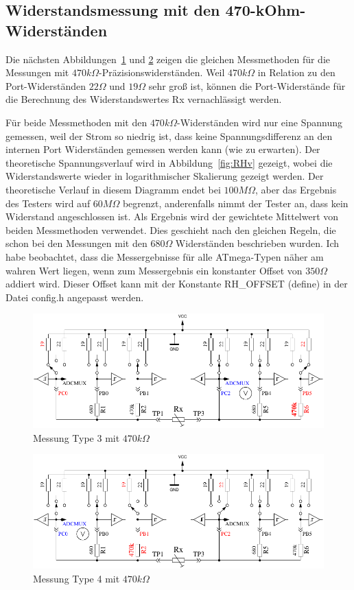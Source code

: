 \subsection{Widerstandsmessung mit den 470-kOhm-Widerständen}
Die nächsten Abbildungen~\ref{fig:RH1mes} und \ref{fig:RH2mes} zeigen die gleichen Messmethoden für die Messungen mit
 \(470k\Omega\)-Präzisionswiderständen.
Weil \(470k\Omega\) in Relation zu den Port-Widerständen \(22\Omega\) und \(19\Omega\) sehr groß ist,
können die Port-Widerstände für die Berechnung des Widerstandswertes Rx vernachlässigt werden.

Für beide Messmethoden mit den \(470k\Omega\)-Widerständen wird nur eine Spannung gemessen, weil der Strom
so niedrig ist, dass keine Spannungsdifferenz an den internen Port Widerständen gemessen werden kann (wie zu erwarten).
Der theoretische Spannungsverlauf wird in Abbildung~\ref{fig:RHv} gezeigt, wobei die Widerstandswerte wieder in
logarithmischer Skalierung gezeigt werden.
Der theoretische Verlauf in diesem Diagramm endet bei \(100M\Omega\), aber das Ergebnis des Testers wird auf
 \(60M\Omega\) begrenzt, anderenfalls nimmt der Tester an, dass kein Widerstand angeschlossen ist.
Als Ergebnis wird der gewichtete Mittelwert von beiden Messmethoden verwendet. Dies geschieht nach den gleichen Regeln, die schon bei
den Messungen mit den  \(680\Omega\) Widerständen beschrieben wurden.
Ich habe beobachtet, dass die Messergebnisse für alle ATmega-Typen  näher am wahren Wert liegen, wenn zum Messergebnis
ein konstanter Offset von \(350\Omega\) addiert wird.
Dieser Offset kann mit der Konstante RH\_OFFSET (define) in der Datei config.h angepasst werden.

\begin{figure}[H]
\centering
\includegraphics[]{../FIG/ResistormessH1.pdf}
\caption{Messung Type 3 mit \(470k\Omega\) }
\label{fig:RH1mes}
\end{figure}

\begin{figure}[H]
 \centering
 \includegraphics[]{../FIG/ResistormessH2.pdf}
 \caption{Messung Type 4 mit \(470k\Omega\) }
\label{fig:RH2mes}
\end{figure}

